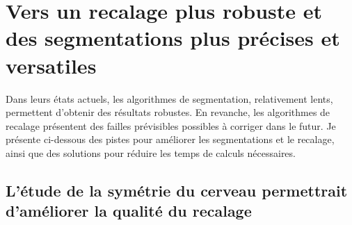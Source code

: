 \documentclass[\main/main.tex]{subfiles}
\begin{document}
                    
\section{Vers un recalage plus robuste et des segmentations plus précises et versatiles}

%
Dans leurs états actuels, les algorithmes de segmentation, relativement lents, permettent d'obtenir des résultats robustes. En revanche, les algorithmes de recalage présentent des failles prévisibles possibles à corriger dans le futur.
Je présente ci-dessous des pistes pour améliorer les segmentations et le recalage,
ainsi que des solutions pour réduire les temps de calculs nécessaires.

    \subsection{L'étude de la symétrie du cerveau permettrait d'améliorer la qualité du recalage}
 
\end{document}
